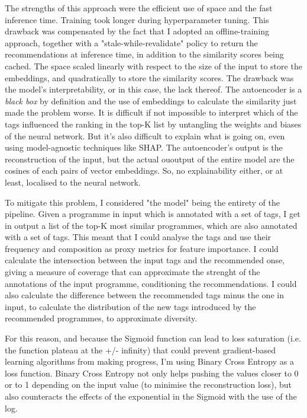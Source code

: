 The strengths of this approach were the efficient use of space and the fast inference time. Training took longer during hyperparameter tuning.
This drawback was compensated by the fact that I adopted an offline-training approach,
together with a "stale-while-revalidate" policy to return the recommendations at inference time, in addition to the similarity scores being cached.
The space scaled linearly with respect to the size of the input to store the embeddings, and quadratically to store the similarity scores.
The drawback was the model's interpretability, or in this case, the lack thereof. The autoencoder is a \textit{black box} by definition and the
use of embeddings to calculate the similarity just made the problem worse. It is difficult if not impossible to interpret which of the tags influenced
the ranking in the top-K list by untangling the weights and biases of the neural network. But it's also difficult to explain what is going on,
even using model-agnostic techniques like SHAP. The autoencoder's output is the reconstruction of the input, but the actual ououtput of the entire model
are the cosines of each pairs of vector embeddings. So, no explainability either, or at least, localised to the neural network.

To mitigate this problem, I considered "the model" being the entirety of the pipeline. Given a programme in input which is annotated with a set of tags,
I get in output a list of the top-K most similar programmes, which are also annotated with a set of tags. This meant that I could analyse the tags
and use their frequency and composition as proxy metrics for feature importance. I could calculate the intersection between the input tags and the
recommended onse, giving a measure of coverage that can approximate the strenght of the annotations of the input programme, conditioning the recommendations.
I could also calculate the difference between the recommended tags minus the one in input, to calculate the distribution of the new tags introduced by
the recommended programmes, to approximate diversity.








For this reason, and because the Sigmoid function can lead to loss saturation (i.e. the function plateau at the +/- infinity) that could prevent gradient-based learning algorithms from making progress, I'm using Binary Cross Entropy as a loss function. Binary Cross Entropy not only helps pushing the values closer to 0 or to 1 depending on the input value (to minimise the reconstruction loss), but also counteracts the effects of the exponential in the Sigmoid with the use of the log.
